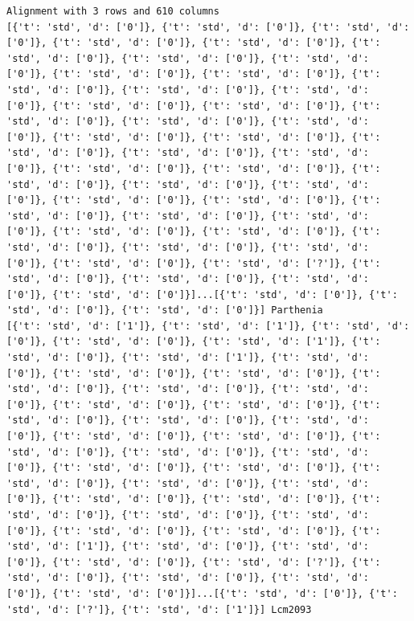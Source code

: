 \documentclass[
  a4paperpaper,
  ,captions=tableheading
]{scrbook}
\begin{document}
\begin{verbatim}
Alignment with 3 rows and 610 columns
[{'t': 'std', 'd': ['0']}, {'t': 'std', 'd': ['0']}, {'t': 'std', 'd': ['0']}, {'t': 'std', 'd': ['0']}, {'t': 'std', 'd': ['0']}, {'t': 'std', 'd': ['0']}, {'t': 'std', 'd': ['0']}, {'t': 'std', 'd': ['0']}, {'t': 'std', 'd': ['0']}, {'t': 'std', 'd': ['0']}, {'t': 'std', 'd': ['0']}, {'t': 'std', 'd': ['0']}, {'t': 'std', 'd': ['0']}, {'t': 'std', 'd': ['0']}, {'t': 'std', 'd': ['0']}, {'t': 'std', 'd': ['0']}, {'t': 'std', 'd': ['0']}, {'t': 'std', 'd': ['0']}, {'t': 'std', 'd': ['0']}, {'t': 'std', 'd': ['0']}, {'t': 'std', 'd': ['0']}, {'t': 'std', 'd': ['0']}, {'t': 'std', 'd': ['0']}, {'t': 'std', 'd': ['0']}, {'t': 'std', 'd': ['0']}, {'t': 'std', 'd': ['0']}, {'t': 'std', 'd': ['0']}, {'t': 'std', 'd': ['0']}, {'t': 'std', 'd': ['0']}, {'t': 'std', 'd': ['0']}, {'t': 'std', 'd': ['0']}, {'t': 'std', 'd': ['0']}, {'t': 'std', 'd': ['0']}, {'t': 'std', 'd': ['0']}, {'t': 'std', 'd': ['0']}, {'t': 'std', 'd': ['0']}, {'t': 'std', 'd': ['0']}, {'t': 'std', 'd': ['0']}, {'t': 'std', 'd': ['0']}, {'t': 'std', 'd': ['?']}, {'t': 'std', 'd': ['0']}, {'t': 'std', 'd': ['0']}, {'t': 'std', 'd': ['0']}, {'t': 'std', 'd': ['0']}]...[{'t': 'std', 'd': ['0']}, {'t': 'std', 'd': ['0']}, {'t': 'std', 'd': ['0']}] Parthenia
[{'t': 'std', 'd': ['1']}, {'t': 'std', 'd': ['1']}, {'t': 'std', 'd': ['0']}, {'t': 'std', 'd': ['0']}, {'t': 'std', 'd': ['1']}, {'t': 'std', 'd': ['0']}, {'t': 'std', 'd': ['1']}, {'t': 'std', 'd': ['0']}, {'t': 'std', 'd': ['0']}, {'t': 'std', 'd': ['0']}, {'t': 'std', 'd': ['0']}, {'t': 'std', 'd': ['0']}, {'t': 'std', 'd': ['0']}, {'t': 'std', 'd': ['0']}, {'t': 'std', 'd': ['0']}, {'t': 'std', 'd': ['0']}, {'t': 'std', 'd': ['0']}, {'t': 'std', 'd': ['0']}, {'t': 'std', 'd': ['0']}, {'t': 'std', 'd': ['0']}, {'t': 'std', 'd': ['0']}, {'t': 'std', 'd': ['0']}, {'t': 'std', 'd': ['0']}, {'t': 'std', 'd': ['0']}, {'t': 'std', 'd': ['0']}, {'t': 'std', 'd': ['0']}, {'t': 'std', 'd': ['0']}, {'t': 'std', 'd': ['0']}, {'t': 'std', 'd': ['0']}, {'t': 'std', 'd': ['0']}, {'t': 'std', 'd': ['0']}, {'t': 'std', 'd': ['0']}, {'t': 'std', 'd': ['0']}, {'t': 'std', 'd': ['0']}, {'t': 'std', 'd': ['0']}, {'t': 'std', 'd': ['1']}, {'t': 'std', 'd': ['0']}, {'t': 'std', 'd': ['0']}, {'t': 'std', 'd': ['0']}, {'t': 'std', 'd': ['?']}, {'t': 'std', 'd': ['0']}, {'t': 'std', 'd': ['0']}, {'t': 'std', 'd': ['0']}, {'t': 'std', 'd': ['0']}]...[{'t': 'std', 'd': ['0']}, {'t': 'std', 'd': ['?']}, {'t': 'std', 'd': ['1']}] Lcm2093

\end{verbatim}
\end{document}
